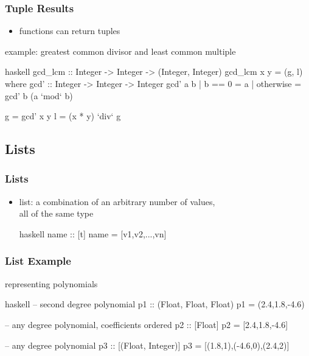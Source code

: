 \documentclass[dvipsnames]{beamer}
\theoremstyle{plain}
\begin{document}
\begin{frame}[fragile]
  \frametitle{Tuple Results}

  \begin{itemize}
    \item functions can return tuples
  \end{itemize}

  \begin{exampleblock}{example: greatest common divisor
                            and least common multiple}
    \begin{pygments}{haskell}
gcd_lcm :: Integer -> Integer -> (Integer, Integer)
gcd_lcm x y = (g, l)
  where
    gcd' :: Integer -> Integer -> Integer
    gcd' a b
      | b == 0    = a
      | otherwise = gcd' b (a `mod` b)

    g = gcd' x y
    l = (x * y) `div` g
    \end{pygments}
  \end{exampleblock}
\end{frame}

\subsection{Lists}

\begin{frame}[fragile]
  \frametitle{Lists}

  \begin{itemize}
    \item \alert{list}: a combination of an arbitrary number of values,\\
      all of the same type
    \begin{block}{}
      \begin{pygments}{haskell}
name :: [t]
name = [v1,v2,...,vn]
      \end{pygments}
    \end{block}
  \end{itemize}
\end{frame}

\begin{frame}[fragile]
  \frametitle{List Example}

  \begin{exampleblock}{representing polynomials}
    \begin{pygments}{haskell}
-- second degree polynomial
p1 :: (Float, Float, Float)
p1 = (2.4,1.8,-4.6)

-- any degree polynomial, coefficients ordered
p2 :: [Float]
p2 = [2.4,1.8,-4.6]

-- any degree polynomial
p3 :: [(Float, Integer)]
p3 = [(1.8,1),(-4.6,0),(2.4,2)]
    \end{pygments}
  \end{exampleblock}
\end{frame}
\end{document}
